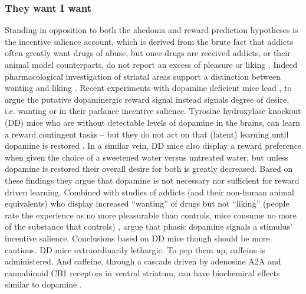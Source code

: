 \documentclass[doc,12pt]{apa}        %
\begin{document}
\subsubsection{They want I want}
\label{subsub:salience}
Standing in opposition to both the ahedonia and reward prediction hypotheses is the incentive salience account, which is derived from the brute fact that addicts often greatly want drugs of abuse, but once drugs are received addicts, or their animal model counterparts, do not report an excess of pleasure or liking \cite{Robinson:1993p8987}.  Indeed pharmacological investigation of striatal areas support a distinction between wanting and liking \cite{Berridge:2003p8998}.  Recent experiments with dopamine deficient mice lead , to argue the putative dopaminergic reward signal instead signals degree of desire, i.e. wanting or in their parlance incentive salience.  Tyrosine hydroxylase knockout (DD) mice who are without detectable levels of dopamine in the brains, can learn a reward contingent tasks -- but they do not act on that (latent) learning until dopamine is restored \cite{Berridge:2007p7235}. In a similar vein, DD mice also display a reward preference when given the choice of a sweetened water versus untreated water, but unless dopamine is restored their overall desire for both is greatly decreased.  Based on these findings they argue that dopamine is not necessary nor sufficient for reward driven learning.  Combined with studies of addicts (and their non-human animal equivalents) who display increased ``wanting'' of drugs but not ``liking'' (people rate the experience as no more pleasurable than controls, mice consume no more of the substance that controls) , argue that phasic dopamine signals a stimulus' incentive salience.  Conclusions based on DD mice though should be more cautious.  DD mice extraordinarily lethargic.  To pep them up, caffeine is administered.  And caffeine, through a cascade driven by adenosine A2A and cannabinoid CB1 receptors in ventral striatum, can have biochemical effects similar to dopamine \cite{Lazarus:2011p8137, Rossi:2010p7252}.
\end{document}
